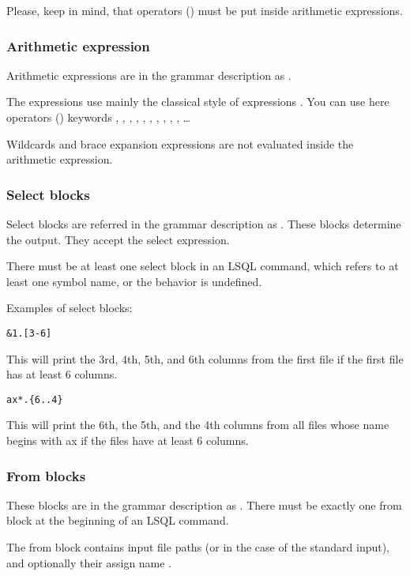 Please, keep in mind, that operators () must be put inside arithmetic expressions.

\subsubsection{Arithmetic expression}
Arithmetic expressions are in the grammar description as .

The expressions use mainly the classical  style of expressions \cite{awk-reference-manual}.  
You can use here operators () keywords \icode{\textgreater}, \icode{\textless}, \icode{\textless=}, \icode{\textgreater=}, \icode{==}, \icode{$\vert\vert$}, \icode{\&\&}, \icode{+}, \icode{-}, \icode{*}, \icode{/}\ldots{}

Wildcards and brace expansion expressions are not evaluated inside the arithmetic expression.

\subsubsection{Select blocks}
Select blocks are referred in the grammar description as .
These blocks determine the output. They accept the select expression.

There must be at least one select block in an LSQL command, which refers to at least one symbol name, or the behavior is undefined.

Examples of select blocks:
\begin{verbatim}
&1.[3-6]
\end{verbatim}
This will print the 3rd, 4th, 5th, and 6th columns from the first file if the first file has at least 6 columns.

\begin{verbatim}
ax*.{6..4}
\end{verbatim}
This will print the 6th, the 5th, and the 4th columns from all files whose name begins with ax if the files have at least 6 columns.

\subsubsection{From blocks}
These blocks are in the grammar description as .
There must be exactly one from block at the beginning of an LSQL command. 

The from block contains input file paths (or \icode{-} in the case of the standard input), and optionally their assign name . 

